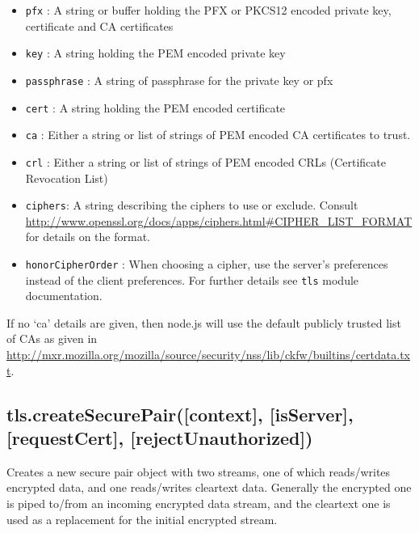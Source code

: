 \begin{itemize}
\itemsep1pt\parskip0pt
\item
  \texttt{pfx} : A string or buffer holding the PFX or PKCS12 encoded
  private key, certificate and CA certificates
\item
  \texttt{key} : A string holding the PEM encoded private key
\item
  \texttt{passphrase} : A string of passphrase for the private key or
  pfx
\item
  \texttt{cert} : A string holding the PEM encoded certificate
\item
  \texttt{ca} : Either a string or list of strings of PEM encoded CA
  certificates to trust.
\item
  \texttt{crl} : Either a string or list of strings of PEM encoded CRLs
  (Certificate Revocation List)
\item
  \texttt{ciphers}: A string describing the ciphers to use or exclude.
  Consult
  \url{http://www.openssl.org/docs/apps/ciphers.html\#CIPHER_LIST_FORMAT}
  for details on the format.
\item
  \texttt{honorCipherOrder} : When choosing a cipher, use the server's
  preferences instead of the client preferences. For further details see
  \texttt{tls} module documentation.
\end{itemize}

If no `ca' details are given, then node.js will use the default publicly
trusted list of CAs as given in
\url{http://mxr.mozilla.org/mozilla/source/security/nss/lib/ckfw/builtins/certdata.txt}.

\subsection{tls.createSecurePair({[}context{]}, {[}isServer{]},
{[}requestCert{]},
{[}rejectUnauthorized{]})}\label{tls.createsecurepaircontext-isserver-requestcert-rejectunauthorized}

\begin{Shaded}
\begin{Highlighting}[]
 \NormalTok{- }  
\end{Highlighting}
\end{Shaded}

Creates a new secure pair object with two streams, one of which
reads/writes encrypted data, and one reads/writes cleartext data.
Generally the encrypted one is piped to/from an incoming encrypted data
stream, and the cleartext one is used as a replacement for the initial
encrypted stream.

